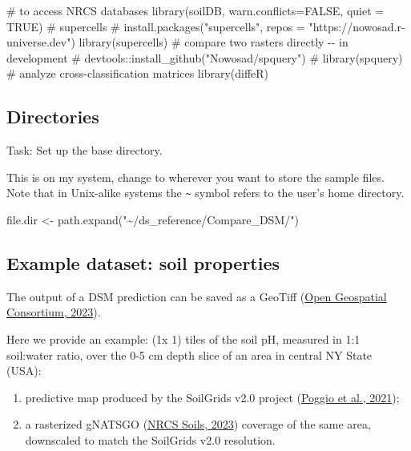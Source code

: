 \documentclass[
  letterpaper,
  DIV=11,
  numbers=noendperiod]{scrartcl}
\newenvironment{Shaded}{\begin{snugshade}}{\end{snugshade}}
\newcommand{\AttributeTok}[1]{\textcolor[rgb]{0.40,0.45,0.13}{#1}}
\newcommand{\CommentTok}[1]{\textcolor[rgb]{0.37,0.37,0.37}{#1}}
\newcommand{\ConstantTok}[1]{\textcolor[rgb]{0.56,0.35,0.01}{#1}}
\newcommand{\FunctionTok}[1]{\textcolor[rgb]{0.28,0.35,0.67}{#1}}
\newcommand{\NormalTok}[1]{\textcolor[rgb]{0.00,0.23,0.31}{#1}}
\newcommand{\OtherTok}[1]{\textcolor[rgb]{0.00,0.23,0.31}{#1}}
\newcommand{\StringTok}[1]{\textcolor[rgb]{0.13,0.47,0.30}{#1}}
\providecommand{\tightlist}{%
  \setlength{\itemsep}{0pt}\setlength{\parskip}{0pt}}\usepackage{longtable,booktabs,array}
\begin{document}
\begin{Shaded}
\begin{Highlighting}[]
\CommentTok{\# to access NRCS databases}
\FunctionTok{library}\NormalTok{(soilDB, }\AttributeTok{warn.conflicts=}\ConstantTok{FALSE}\NormalTok{, }\AttributeTok{quiet =} \ConstantTok{TRUE}\NormalTok{)}
\CommentTok{\# supercells}
\CommentTok{\# install.packages("supercells", repos = "https://nowosad.r{-}universe.dev")}
\FunctionTok{library}\NormalTok{(supercells)}
\CommentTok{\# compare two rasters directly {-}{-} in development}
\CommentTok{\# devtools::install\_github("Nowosad/spquery")}
\CommentTok{\# library(spquery)}
\CommentTok{\# analyze cross{-}classification matrices}
\FunctionTok{library}\NormalTok{(diffeR) }
\end{Highlighting}
\end{Shaded}

\hypertarget{directories}{%
\subsection{Directories}\label{directories}}

Task: Set up the base directory.

This is on my system, change to wherever you want to store the sample
files. Note that in Unix-alike systems the \texttt{\textasciitilde{}}
symbol refers to the user's home directory.

\begin{Shaded}
\begin{Highlighting}[]
\NormalTok{file.dir }\OtherTok{\textless{}{-}} \FunctionTok{path.expand}\NormalTok{(}\StringTok{"\textasciitilde{}/ds\_reference/Compare\_DSM/"}\NormalTok{)}
\end{Highlighting}
\end{Shaded}

\hypertarget{example-dataset-soil-properties}{%
\subsection{Example dataset: soil
properties}\label{example-dataset-soil-properties}}

The output of a DSM prediction can be saved as a GeoTiff
(\protect\hyperlink{ref-OGCGeoTIFFStandard2023}{Open Geospatial
Consortium, 2023}).

Here we provide an example: (1\textdegree x 1\textdegree) tiles of the
soil pH, measured in 1:1 soil:water ratio, over the 0-5 cm depth slice
of an area in central NY State (USA):

\begin{enumerate}
\def\labelenumi{(\arabic{enumi})}
\tightlist
\item
  predictive map produced by the SoilGrids v2.0 project
  (\protect\hyperlink{ref-Poggio.etal2021a}{Poggio et al., 2021});
\item
  a rasterized gNATSGO
  (\protect\hyperlink{ref-nrcssoilsGriddedNationalSoil2023}{NRCS Soils,
  2023}) coverage of the same area, downscaled to match the SoilGrids
  v2.0 resolution.
\end{enumerate}
\end{document}
